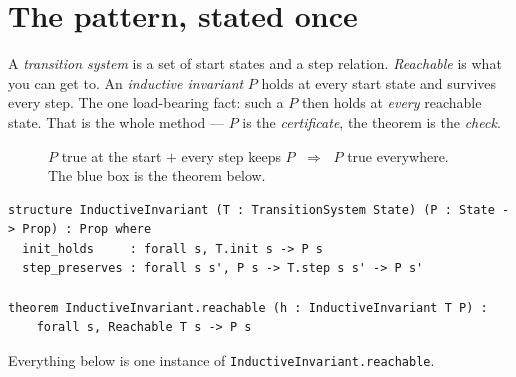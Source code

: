 \documentclass[runningheads]{llncs}
\begin{document}
\section{The pattern, stated once}

A \emph{transition system} is a set of start states and a step relation.
\emph{Reachable} is what you can get to. An \emph{inductive invariant} $P$ holds
at every start state and survives every step. The one load-bearing fact: such a
$P$ then holds at \emph{every} reachable state. That is the whole method ---
$P$ is the \emph{certificate}, the theorem is the \emph{check}.

\begin{figure}[H]
\centering
{}
\caption{$P$ true at the start $+$ every step keeps $P$ $\;\Rightarrow\;$
$P$ true everywhere. The blue box is the theorem below.}
\label{fig:soundness}
\end{figure}

\begin{lstlisting}[style=lean]
structure InductiveInvariant (T : TransitionSystem State) (P : State -> Prop) : Prop where
  init_holds     : forall s, T.init s -> P s
  step_preserves : forall s s', P s -> T.step s s' -> P s'

theorem InductiveInvariant.reachable (h : InductiveInvariant T P) :
    forall s, Reachable T s -> P s
\end{lstlisting}

\noindent
Everything below is one instance of \lstinline[style=lean]|InductiveInvariant.reachable|.
\end{document}
